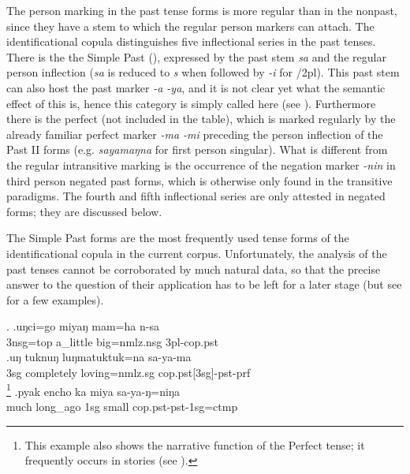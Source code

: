 The person marking in the past tense forms is more regular than in the nonpast, since they have a stem to which the regular person markers can attach. The identificational copula distinguishes five inflectional series in the past tenses. There is the the Simple Past (), expressed by the past stem \emph{sa} and the regular person inflection (\emph{sa} is reduced to \emph{s} when followed by \emph{-i} for {/2pl}). This past stem can also host the past marker \emph{-a \ti -ya}, and it is not clear yet what the semantic effect of this is, hence this category is simply called  here (see ). Furthermore there is the perfect (not included in the table), which is marked regularly by the already familiar perfect marker \emph{-ma \ti -mi} preceding the person inflection of the Past II forms (e.g. \emph{sayamaŋna}  for first person singular). What is  different from the regular intransitive marking is the occurrence of the negation marker \emph{-nin} in third person negated past forms, which is otherwise only found in the transitive paradigms. The fourth and fifth inflectional series are only attested in negated forms; they are discussed below.  


The Simple Past forms are the most frequently used tense forms of the identificational copula in the current corpus. Unfortunately, the  analysis of the past tenses cannot be corroborated by much natural data, so that the precise answer to the question of their application has to be left for a later stage (but see \Next for a few examples).

\ex. \ag.uŋci=go     miyaŋ mam=ha n-sa \\
{\sc 3nsg=top} a\_little big{\sc =nmlz.nsg} {\sc 3pl-cop.pst}\\
\bg.uŋ tuknuŋ    luŋmatuktuk=na        sa-ya-ma\\
{\sc 3sg} completely loving{\sc =nmlz.sg} {\sc cop.pst[3sg]-pst-prf}\\
\footnote{This example also shows the narrative function of the Perfect tense; it frequently occurs in stories (see ).}  
\bg.pyak encho         ka  miya   sa-ya-ŋ=niŋa\\
much long\_ago {\sc 1sg} small {\sc cop.pst-pst-1sg=ctmp}\\
 
 
